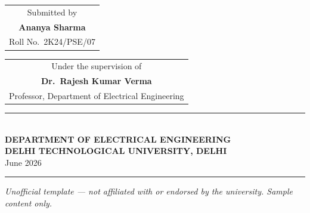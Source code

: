 \documentclass[12pt,a4paper]{report}
\begin{document}
\begin{titlepage}
\vspace{1.0cm}
\begin{tabular}{c}
{\normalsize\color{black!70} Submitted by} \\[6pt]
{\Large\bfseries\color{dtumaroon} Ananya Sharma} \\[2pt]
{\normalsize\color{black!70} Roll No.\ 2K24/PSE/07}
\end{tabular}

\vspace{1.0cm}
\begin{tabular}{c}
{\normalsize\color{black!70} Under the supervision of} \\[6pt]
{\large\bfseries\color{dtunavy} Dr.\ Rajesh Kumar Verma} \\[2pt]
{\normalsize\color{black!70} Professor, Department of Electrical Engineering}
\end{tabular}

\vfill

{\color{dtugold}\rule{0.55\textwidth}{1pt}}\\[6pt]
{\bfseries\color{dtunavy} DEPARTMENT OF ELECTRICAL ENGINEERING}\\[2pt]
{\bfseries\color{dtunavy} DELHI TECHNOLOGICAL UNIVERSITY, DELHI}\\[2pt]
{\color{black!70} June 2026}

\vspace{0.9cm}
\noindent\rule{\textwidth}{0.4pt}
\footnotesize\itshape
Unofficial template --- not affiliated with or endorsed by the university. Sample content only.

\restoregeometry
\end{titlepage}

\pagestyle{plain}
































\end{document}
